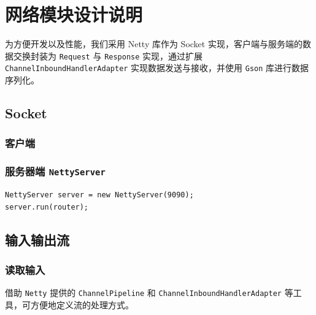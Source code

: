 \documentclass{article}
\begin{document}
\section{网络模块设计说明}

为方便开发以及性能，我们采用 Netty 库作为 Socket 实现，客户端与服务端的数据交换封装为 \texttt{Request} 与 \texttt{Response} 实现，通过扩展 \texttt{ChannelInboundHandlerAdapter} 实现数据发送与接收，并使用 \texttt{Gson} 库进行数据序列化。

\subsection{Socket}
\subsubsection{客户端}

\subsubsection{服务器端 \texttt{NettyServer}}

\begin{table}[H]
  \centering
\end{table}

\begin{lstlisting}
NettyServer server = new NettyServer(9090);
server.run(router);
\end{lstlisting}

\subsection{输入输出流}
\subsubsection{读取输入}

借助 \texttt{Netty} 提供的 \texttt{ChannelPipeline} 和 \texttt{ChannelInboundHandlerAdapter} 等工具，可方便地定义流的处理方式。
\end{document}
